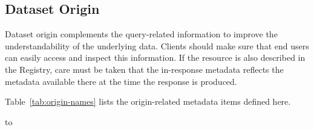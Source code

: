 \documentclass[11pt,a4paper]{ivoa}
\begin{document}
\subsection{Dataset Origin}
Dataset origin complements the query-related information to improve the
understandability of the underlying data.  Clients should make
sure that end users can easily access and inspect this information.
If the resource is also described in the Registry, care
must be taken that the in-response metadata reflects the metadata
available there at the time the response is produced.


Table~\ref{tab:origin-names} lists the origin-related metadata items
defined here.

\begin{table}
\hbox to
\end{table}
\end{document}
